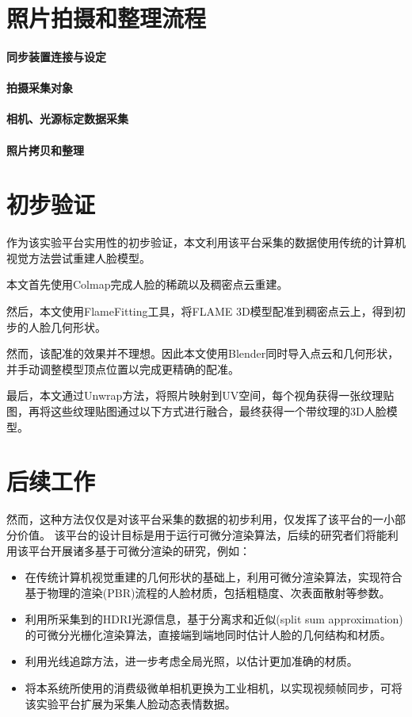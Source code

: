 \section{照片拍摄和整理流程}

\paragraph{同步装置连接与设定}

\paragraph{拍摄采集对象}

\paragraph{相机、光源标定数据采集}

\paragraph{照片拷贝和整理}

\section{初步验证}

作为该实验平台实用性的初步验证，本文利用该平台采集的数据使用传统的计算机视觉方法尝试重建人脸模型。

本文首先使用Colmap完成人脸的稀疏以及稠密点云重建。

然后，本文使用FlameFitting工具，将FLAME 3D模型配准到稠密点云上，得到初步的人脸几何形状。

然而，该配准的效果并不理想。因此本文使用Blender同时导入点云和几何形状，并手动调整模型顶点位置以完成更精确的配准。

最后，本文通过Unwrap方法，将照片映射到UV空间，每个视角获得一张纹理贴图，再将这些纹理贴图通过以下方式进行融合，最终获得一个带纹理的3D人脸模型。



\section{后续工作}

然而，这种方法仅仅是对该平台采集的数据的初步利用，仅发挥了该平台的一小部分价值。
该平台的设计目标是用于运行可微分渲染算法，后续的研究者们将能利用该平台开展诸多基于可微分渲染的研究，例如：
\begin{itemize}
\item 在传统计算机视觉重建的几何形状的基础上，利用可微分渲染算法，实现符合基于物理的渲染(PBR)流程的人脸材质，包括粗糙度、次表面散射等参数。
\item 利用所采集到的HDRI光源信息，基于分离求和近似(split sum approximation)的可微分光栅化渲染算法，直接端到端地同时估计人脸的几何结构和材质。
\item 利用光线追踪方法，进一步考虑全局光照，以估计更加准确的材质。
\item 将本系统所使用的消费级微单相机更换为工业相机，以实现视频帧同步，可将该实验平台扩展为采集人脸动态表情数据。
\end{itemize}
